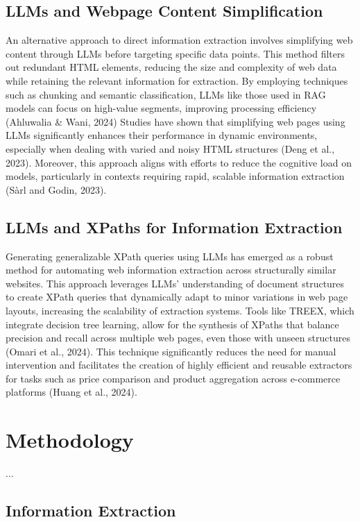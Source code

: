 \documentclass[a4paper]{article}
\begin{document}
\subsection{LLMs and Webpage Content Simplification}
An alternative approach to direct information extraction involves simplifying web content through LLMs before targeting specific data points. This method filters out redundant HTML elements, reducing the size and complexity of web data while retaining the relevant information for extraction. By employing techniques such as chunking and semantic classification, LLMs like those used in RAG models can focus on high-value segments, improving processing efficiency (Ahluwalia \& Wani, 2024) Studies have shown that simplifying web pages using LLMs significantly enhances their performance in dynamic environments, especially when dealing with varied and noisy HTML structures (Deng et al., 2023). Moreover, this approach aligns with efforts to reduce the cognitive load on models, particularly in contexts requiring rapid, scalable information extraction (Sàrl and Godin, 2023).

\subsection{LLMs and XPaths for Information Extraction}
Generating generalizable XPath queries using LLMs has emerged as a robust method for automating web information extraction across structurally similar websites. This approach leverages LLMs’ understanding of document structures to create XPath queries that dynamically adapt to minor variations in web page layouts, increasing the scalability of extraction systems. Tools like TREEX, which integrate decision tree learning, allow for the synthesis of XPaths that balance precision and recall across multiple web pages, even those with unseen structures (Omari et al., 2024). This technique significantly reduces the need for manual intervention and facilitates the creation of highly efficient and reusable extractors for tasks such as price comparison and product aggregation across e-commerce platforms (Huang et al., 2024). 
\section{Methodology}

...

\subsection{Information Extraction }
\end{document}
